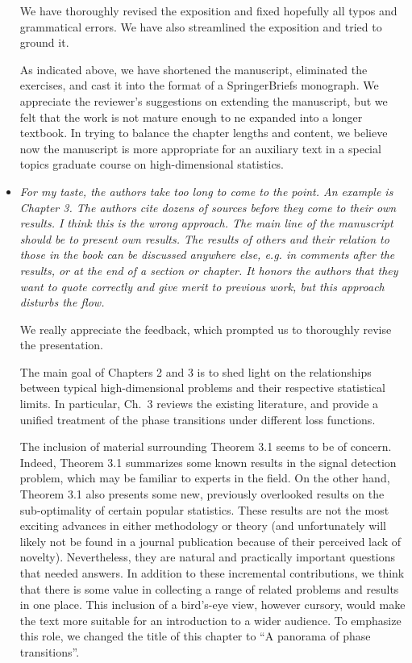 \documentclass[11pt]{article}
\begin{document}
\begin{itemize}
     We have thoroughly revised the exposition and fixed hopefully all typos and grammatical errors.  We have also streamlined the exposition 
     and tried to ground it.
     
     As indicated above, we have shortened the manuscript, eliminated the exercises, and cast it into the format of a SpringerBriefs monograph.  We 
     appreciate the reviewer's suggestions on extending the manuscript, but we felt that the work is not mature enough to ne expanded into a longer textbook.
     In trying to balance the chapter lengths and content, we believe now the manuscript is more appropriate for an auxiliary text in a special topics graduate course on high-dimensional statistics.
     
     
     \item {\em For my taste, the authors take too long to come to the point. An example is Chapter 3. The authors cite dozens of sources before they come to their own results. I think this is the wrong approach. The main line of the manuscript should be to present own results. The results of others and their relation to those in the book can be discussed anywhere else, e.g. in comments after the results, or at the end of a section or chapter. It honors the authors that they want to quote correctly and give merit to previous work, but this approach disturbs the flow.}
     
     We really appreciate the feedback, which prompted us to thoroughly revise the presentation.
     
     The main goal of Chapters 2 and 3 is to shed light on the relationships between typical high-dimensional problems and their respective statistical limits. 
     In particular, Ch.\ 3 reviews the existing literature, and provide a unified treatment of the phase transitions under different loss functions.
     
     The inclusion of material surrounding Theorem 3.1 seems to be of concern.
     Indeed, Theorem 3.1 summarizes some known results in the signal detection problem, which may be familiar to experts in the field.
     On the other hand, Theorem 3.1 also presents some new, previously overlooked results on the sub-optimality of certain popular statistics. 
     These results are not the most exciting advances in either methodology or theory (and unfortunately will likely not be found in a journal publication because of their perceived lack of novelty). Nevertheless, they are natural and practically important questions that needed answers.
     In addition to these incremental contributions, we think that there is some value in collecting a range of related problems and results in one place. This inclusion of a bird's-eye view, however cursory,  would make the text more suitable for an introduction to a wider audience. 
     To emphasize this role, we changed the title of this chapter to ``A panorama of phase transitions''. 


\end{itemize}
\end{document}
